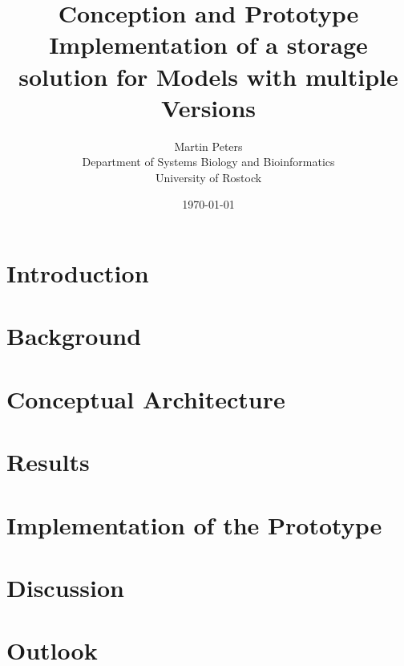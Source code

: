 \documentclass[12pt, a4paper, titlepage]{book}
\title{Conception and Prototype Implementation of a storage solution for Models with multiple Versions}
\author{Martin Peters\\[12pt]
	\small Department of Systems Biology and Bioinformatics\\
	\small University of Rostock}
\date{\today}
\begin{document}
	\maketitle
	\tableofcontents
	
	\chapter{Introduction}
	
	
	\chapter{Background}
	
	
	\chapter{Conceptual Architecture}
	
	
	\chapter{Results}
	
	
	\chapter{Implementation of the Prototype}
	
	
	\chapter{Discussion}
	
	
	\chapter{Outlook}
	
	
	
	
	
	\begin{appendix}
		\listoffigures
	\end{appendix}
\end{document}
